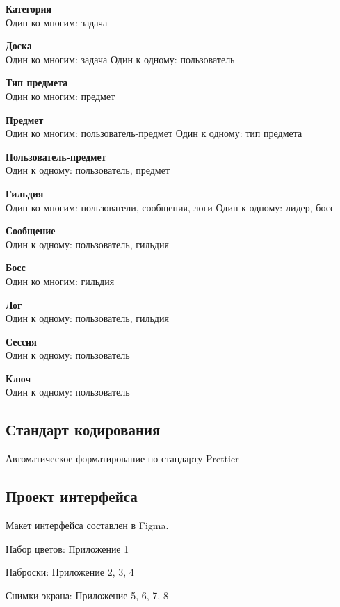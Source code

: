 \documentclass[../document.tex]{subfiles}
\begin{document}
\par \textbf{Категория}\\
Один ко многим: задача

\par \textbf{Доска}\\
Один ко многим: задача
Один к одному: пользователь

\par \textbf{Тип предмета}\\
Один ко многим: предмет

\par \textbf{Предмет}\\
Один ко многим: пользователь-предмет
Один к одному: тип предмета

\par \textbf{Пользователь-предмет}\\
Один к одному: пользователь, предмет

\par \textbf{Гильдия}\\
Один ко многим: пользователи, сообщения, логи
Один к одному: лидер, босс

\par \textbf{Сообщение}\\
Один к одному: пользователь, гильдия

\par \textbf{Босс}\\
Один ко многим: гильдия

\par \textbf{Лог}\\
Один к одному: пользователь, гильдия

\par \textbf{Сессия}\\
Один к одному: пользователь

\par \textbf{Ключ}\\
Один к одному: пользователь

\subsection{Стандарт кодирования}
\par Автоматическое форматирование по стандарту Prettier
\subsection{Проект интерфейса}
\par Макет интерфейса составлен в Figma.

\par Набор цветов: Приложение 1

\par Наброски: Приложение 2, 3, 4

\par Снимки экрана: Приложение 5, 6, 7, 8
\end{document}
